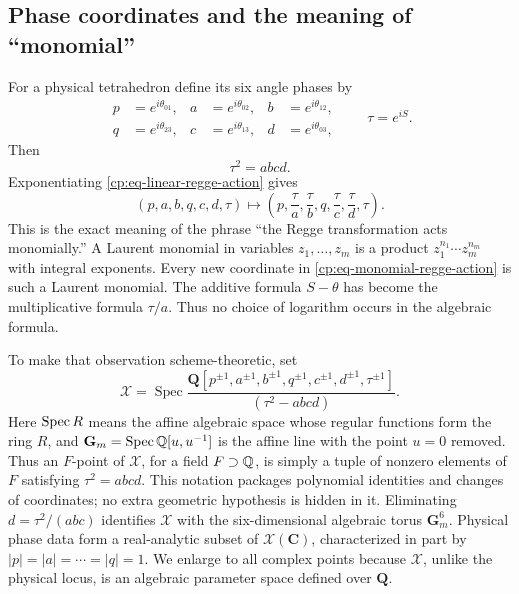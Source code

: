\subsection{Phase coordinates and the meaning of ``monomial''}
\label{cp:subsec-phase-coordinates}

For a physical tetrahedron define its six angle phases by
\begin{equation}
 \begin{aligned}
 p&=e^{i\theta_{01}},&
 a&=e^{i\theta_{02}},&
 b&=e^{i\theta_{12}},\\
 q&=e^{i\theta_{23}},&
 c&=e^{i\theta_{13}},&
 d&=e^{i\theta_{03}},
 \end{aligned}
 \qquad \tau=e^{iS}.
 \label{cp:eq-angle-phases}
\end{equation}
Then
\begin{equation}
 \tau^2=abcd.
 \label{cp:eq-phase-relation}
\end{equation}
Exponentiating \eqref{cp:eq-linear-regge-action} gives
\begin{equation}
 (p,a,b,q,c,d,\tau)\longmapsto
 \left(p,\frac\tau a,\frac\tau b,q,
              \frac\tau c,\frac\tau d,\tau\right).
 \label{cp:eq-monomial-regge-action}
\end{equation}
This is the exact meaning of the phrase ``the Regge transformation acts
monomially.''  A Laurent monomial in variables \(z_1,\ldots,z_m\) is a
product \(z_1^{n_1}\cdots z_m^{n_m}\) with integral exponents.  Every new
coordinate in \eqref{cp:eq-monomial-regge-action} is such a Laurent
monomial.  The additive formula \(S-\theta\) has become the multiplicative
formula \(\tau/a\).  Thus no choice of logarithm occurs in the algebraic
formula.

To make that observation scheme-theoretic, set
\begin{equation}
 \mathcal X=
 \operatorname{Spec}
 \frac{\mathbf Q[p^{\pm1},a^{\pm1},b^{\pm1},q^{\pm1},
                         c^{\pm1},d^{\pm1},\tau^{\pm1}]}
      {(\tau^2-abcd)}.
 \label{cp:eq-phase-torus}
\end{equation}
Here \(\operatorname{Spec} R\) means the affine algebraic space whose regular functions
form the ring \(R\), and \(\mathbf G_m=\operatorname{Spec}\mathbb Q[u,u^{-1}]\) is the affine
line with the point \(u=0\) removed.  Thus an \(F\)-point of
\(\mathcal X\), for a field \(F\supset\mathbb Q\), is simply a tuple of nonzero
elements of \(F\) satisfying \(\tau^2=abcd\).  This notation packages
polynomial identities and changes of coordinates; no extra geometric
hypothesis is hidden in it.
Eliminating \(d=\tau^2/(abc)\) identifies \(\mathcal X\) with the
six-dimensional algebraic torus \(\mathbf G_m^6\).  Physical phase data form
a real-analytic subset of \(\mathcal X(\mathbf C)\), characterized in part
by \(|p|=|a|=\cdots=|q|=1\).  We enlarge to all complex points because
\(\mathcal X\), unlike the physical locus, is an algebraic parameter space
defined over \(\mathbf Q\).

